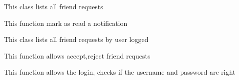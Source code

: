 \documentclass[letterpaper,10pt,english]{sphinxmanual}
\begin{document}
\begin{fulllineitems}
\label{modules/account:apps.account.views.FriendInvitationList}
This class lists all friend requests

\begin{fulllineitems}
\label{modules/account:apps.account.views.FriendInvitationList.get_context_data}
This function mark as read a notification

\end{fulllineitems}


\begin{fulllineitems}
\label{modules/account:apps.account.views.FriendInvitationList.get_queryset}
This class lists all friend requests by user logged

\end{fulllineitems}


\begin{fulllineitems}
\label{modules/account:apps.account.views.FriendInvitationList.post}
This function allows accept,reject friend requests

\end{fulllineitems}


\end{fulllineitems}


\begin{fulllineitems}
\label{modules/account:apps.account.views.Login}
This function allows the login, checks if the username and password are right

\end{fulllineitems}

\end{document}
